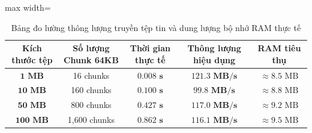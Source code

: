 \documentclass[a4paper,12pt]{article}
\renewcommand{\arraystretch}{1.2}
\begin{document}
\begin{table}[H]
\centering
\renewcommand{\arraystretch}{1.2}
\begin{adjustbox}{max width=\textwidth}
\begin{tabular}{|c|c|c|c|c|}
\hline
\textbf{Kích thước tệp} & \textbf{Số lượng Chunk 64KB} & \textbf{Thời gian thực tế} & \textbf{Thông lượng hiệu dụng} & \textbf{RAM tiêu thụ} \\ \hline
$\mathbf{1\text{ MB}}$ & 16 chunks & $\mathbf{0.008\text{ s}}$ & $\mathbf{121.3\text{ MB/s}}$ & $\approx 8.5\text{ MB}$ \\ \hline
$\mathbf{10\text{ MB}}$ & 160 chunks & $\mathbf{0.100\text{ s}}$ & $\mathbf{99.8\text{ MB/s}}$ & $\approx 8.8\text{ MB}$ \\ \hline
$\mathbf{50\text{ MB}}$ & 800 chunks & $\mathbf{0.427\text{ s}}$ & $\mathbf{117.0\text{ MB/s}}$ & $\approx 9.2\text{ MB}$ \\ \hline
$\mathbf{100\text{ MB}}$ & 1,600 chunks & $\mathbf{0.862\text{ s}}$ & $\mathbf{116.1\text{ MB/s}}$ & $\approx 9.5\text{ MB}$ \\ \hline
\end{tabular}
\end{adjustbox}
\caption{Bảng đo lường thông lượng truyền tệp tin và dung lượng bộ nhớ RAM thực tế}
\label{tab:file_benchmark_real}
\end{table}
\end{document}
